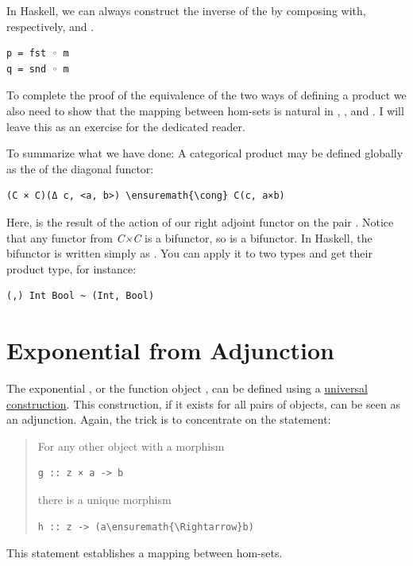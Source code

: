 In Haskell, we can always construct the inverse of the
 by composing  with, respectively,
 and .

\begin{Verbatim}[commandchars=\\\{\}]
p = fst ◦ m
q = snd ◦ m
\end{Verbatim}
To complete the proof of the equivalence of the two ways of defining a
product we also need to show that the mapping between hom-sets is
natural in , , and . I will leave this as
an exercise for the dedicated reader.

To summarize what we have done: A categorical product may be defined
globally as the  of the diagonal functor:

\begin{Verbatim}[commandchars=\\\{\}]
(C × C)(Δ c, <a, b>) \ensuremath{\cong} C(c, a×b)
\end{Verbatim}
Here,  is the result of the action of our right adjoint
functor  on the pair
. Notice that any functor from
\emph{C×C} is a bifunctor, so  is a bifunctor. In
Haskell, the  bifunctor is written simply as
\code{(,)}. You can apply it to two types and get their product type,
for instance:

\begin{Verbatim}[commandchars=\\\{\}]
(,) Int Bool ~ (Int, Bool)
\end{Verbatim}

\section{Exponential from
Adjunction}\label{exponential-from-adjunction}

The exponential , or the function object , can be
defined using a \hyperref[function-types]{universal
construction}. This construction, if it exists for all pairs of objects,
can be seen as an adjunction. Again, the trick is to concentrate on the
statement:

\begin{quote}
For any other object  with a morphism

\begin{Verbatim}[commandchars=\\\{\}]
g :: z × a -> b
\end{Verbatim}
there is a unique morphism

\begin{Verbatim}[commandchars=\\\{\}]
h :: z -> (a\ensuremath{\Rightarrow}b)
\end{Verbatim}
\end{quote}
This statement establishes a mapping between hom-sets.

